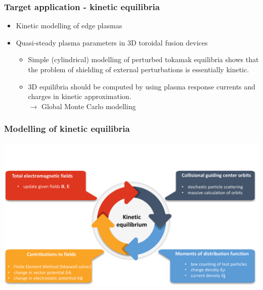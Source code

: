 \documentclass{beamer}
\begin{document}
\begin{frame}
\frametitle{Target application - kinetic equilibria}
\begin{itemize}
\item Kinetic modelling of edge plasmas
\item Quasi-steady plasma parameters in 3D toroidal fusion devices
\begin{itemize}
\item Simple (cylindrical) modelling of perturbed tokamak equilibria shows that the problem of shielding of external perturbations is essentially kinetic.
\item 3D equilibria should be computed by using plasma response currents and charges in kinetic approximation. \\
$\rightarrow$ Global Monte Carlo modelling
\end{itemize}
\end{itemize}
\end{frame}




\begin{frame}
\frametitle{Modelling of kinetic equilibria}
	\centering \includegraphics[trim={0 0 0 3cm},clip,width=\textwidth]{FIGURES/cycle01.pdf}
\end{frame}


\end{document}
